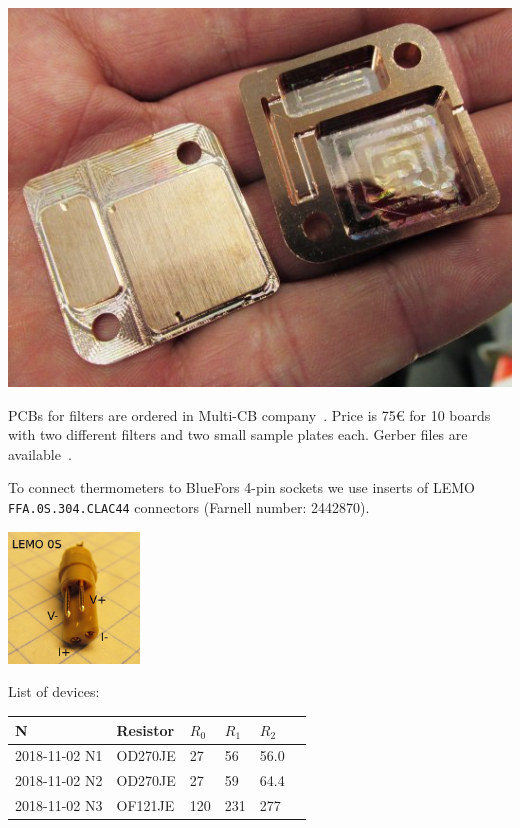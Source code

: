 \documentclass[a4paper]{article}
\begin{document}
\begin{center}
\includegraphics[width=\linewidth]{img/box.jpg}
\end{center}

PCBs for filters are ordered in Multi-CB company~\cite{multi-cb}. Price is 75\euro{}
for 10 boards with two different filters and two small sample plates each. Gerber
files are available~\cite{filterpcb}.

To connect thermometers to BlueFors 4-pin sockets we use inserts
of LEMO {\tt FFA.0S.304.CLAC44} connectors (Farnell number: 2442870).

\begin{center}
\includegraphics[width=3.5cm]{img/conn.jpg}
\end{center}

List of devices:

\noindent
\begin{tabular}{|ll lll l|}\hline
N& Resistor& $R_0$ & $R_1$ & $R_2$ & \\
\hline
2018-11-02 N1&OD270JE& 27  & 56  & 56.0&\\
2018-11-02 N2&OD270JE& 27  & 59  & 64.4&\\
2018-11-02 N3&OF121JE& 120 & 231 & 277&\\
\hline
\end{tabular}
\medskip
\end{document}
